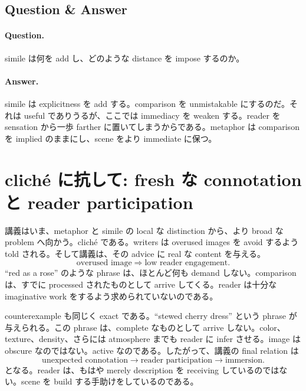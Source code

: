 \subsection{Question \& Answer}

\paragraph{Question.} simile は何を add し、どのような distance を impose するのか。

\paragraph{Answer.} simile は explicitness を add する。comparison を unmistakable にするのだ。それは useful でありうるが、ここでは immediacy を weaken する。reader を sensation から一歩 farther に置いてしまうからである。metaphor は comparison を implied のままにし、scene をより immediate に保つ。

\section{clich\'e に抗して: fresh な connotation と reader participation}

講義はいま、metaphor と simile の local な distinction から、より broad な problem へ向かう。clich\'e である。writers は overused images を avoid するよう told される。そして講義は、その advice に real な content を与える。
\begin{equation}
\text{overused image} \Rightarrow \text{low reader engagement}.
\end{equation}
``red as a rose'' のような phrase は、ほとんど何も demand しない。comparison は、すでに processed されたものとして arrive してくる。reader は十分な imaginative work をするよう求められていないのである。

counterexample も同じく exact である。``stewed cherry dress'' という phrase が与えられる。この phrase は、complete なものとして arrive しない。color、texture、density、さらには atmosphere までも reader に infer させる。image は obscure なのではない。active なのである。したがって、講義の final relation は
\begin{equation}
\text{unexpected connotation} \to \text{reader participation} \to \text{immersion}.
\end{equation}
となる。reader は、もはや merely description を receiving しているのではない。scene を build する手助けをしているのである。

